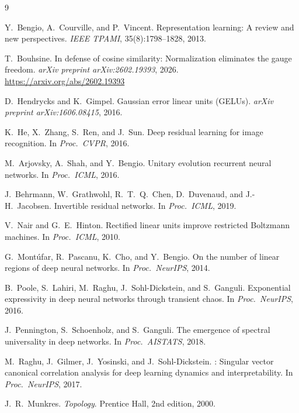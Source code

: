 \documentclass[11pt,a4paper]{article}
\theoremstyle{remark}
\begin{document}
\begin{thebibliography}{9}

Y.~Bengio, A.~Courville, and P.~Vincent.
\newblock Representation learning: A review and new perspectives.
\newblock \emph{IEEE TPAMI}, 35(8):1798--1828, 2013.

T.~Bouhsine.
\newblock In defense of cosine similarity: Normalization eliminates the gauge freedom.
\newblock \emph{arXiv preprint arXiv:2602.19393}, 2026.
\newblock \url{https://arxiv.org/abs/2602.19393}

D.~Hendrycks and K.~Gimpel.
\newblock Gaussian error linear units (GELUs).
\newblock \emph{arXiv preprint arXiv:1606.08415}, 2016.

K.~He, X.~Zhang, S.~Ren, and J.~Sun.
\newblock Deep residual learning for image recognition.
\newblock In \emph{Proc.\ CVPR}, 2016.

M.~Arjovsky, A.~Shah, and Y.~Bengio.
\newblock Unitary evolution recurrent neural networks.
\newblock In \emph{Proc.\ ICML}, 2016.

J.~Behrmann, W.~Grathwohl, R.~T.~Q.~Chen, D.~Duvenaud, and J.-H.~Jacobsen.
\newblock Invertible residual networks.
\newblock In \emph{Proc.\ ICML}, 2019.

V.~Nair and G.~E.~Hinton.
\newblock Rectified linear units improve restricted Boltzmann machines.
\newblock In \emph{Proc.\ ICML}, 2010.

G.~Mont\'{u}far, R.~Pascanu, K.~Cho, and Y.~Bengio.
\newblock On the number of linear regions of deep neural networks.
\newblock In \emph{Proc.\ NeurIPS}, 2014.

B.~Poole, S.~Lahiri, M.~Raghu, J.~Sohl-Dickstein, and S.~Ganguli.
\newblock Exponential expressivity in deep neural networks through transient chaos.
\newblock In \emph{Proc.\ NeurIPS}, 2016.

J.~Pennington, S.~Schoenholz, and S.~Ganguli.
\newblock The emergence of spectral universality in deep networks.
\newblock In \emph{Proc.\ AISTATS}, 2018.

M.~Raghu, J.~Gilmer, J.~Yosinski, and J.~Sohl-Dickstein.
: Singular vector canonical correlation analysis for deep learning dynamics and interpretability.
\newblock In \emph{Proc.\ NeurIPS}, 2017.

J.~R.~Munkres.
\newblock \emph{Topology}.
\newblock Prentice Hall, 2nd edition, 2000.

\end{thebibliography}
\end{document}
